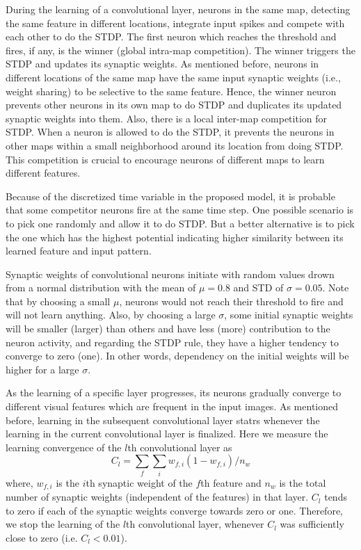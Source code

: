 \documentclass[preprint,5p,12pt,twocolumn]{article}
\begin{document}
During the learning of a convolutional layer, neurons in the same map, detecting the same feature in different locations, integrate input spikes and compete with each other to do the STDP. The first neuron which reaches the threshold and fires, if any, is the winner (global intra-map competition). The winner triggers the STDP and updates its synaptic weights. As mentioned before, neurons in different locations of the same map  have the same input synaptic weights (i.e., weight sharing) to be selective to the same feature. Hence, the winner neuron prevents other neurons in its own map to do STDP and duplicates its updated synaptic weights into them. Also, there is a local inter-map competition for STDP. When a neuron is allowed to do the STDP, it prevents the neurons in other maps within a small neighborhood around its location from doing STDP. This competition is crucial to encourage neurons of different maps to learn different features.

Because of the discretized time variable in the proposed model, it is probable that some competitor neurons fire at the same time step. One possible scenario is to pick one randomly and allow it to do STDP. But a better alternative is to pick the one which has the highest potential indicating higher similarity between its learned feature and input pattern.

Synaptic weights of convolutional neurons initiate with random values drown from a normal distribution with the mean of $\mu=0.8$ and STD of $\sigma=0.05$. Note that by choosing a small $ \mu $, neurons would not reach their threshold to fire and will not learn anything. Also, by  choosing a large $\sigma$, some initial synaptic weights will be smaller (larger) than others and have less (more) contribution to the neuron activity, and regarding the STDP rule, they have a higher tendency to converge to zero (one). In other words, dependency on the initial weights will be higher for a large $\sigma$.


 As the learning of a specific layer progresses, its neurons gradually converge to different visual features which are frequent in the input images. As mentioned before, learning in the subsequent convolutional layer statrs whenever the learning in the current convolutional layer is finalized. Here we measure the learning convergence of the $l$th convolutional layer as
\begin{equation}
C_l=\sum_{f}\sum_{i}{w_{f,i}(1-w_{f,i})}/n_w
\end{equation}
where, $w_{f,i}$ is the $i$th synaptic weight of the $f$th feature and $n_w$ is the total number of synaptic weights (independent of the features) in that layer. $C_l$ tends to zero if each of the synaptic weights converge towards zero or one. Therefore, we stop the learning of the $l$th convolutional layer, whenever $C_l$ was sufficiently close to zero (i.e. $C_l< 0.01$).
\end{document}
